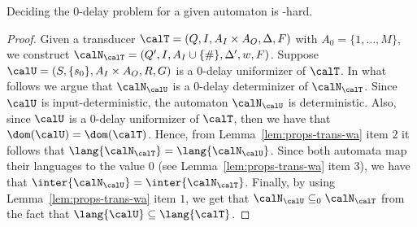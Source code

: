 \documentclass[a4paper]{article}
\begin{document}
\begin{lemma}\label{lem:0delay-exp-hard}
	Deciding the $0$-delay problem for a given automaton is
	\EXP-hard.
\end{lemma}
\begin{proof}
	Given a transducer $\calT = (Q,I,A_I \times A_O,\Delta,F)$ with $A_0 =
	\{1,\dots,M\}$, we construct
	$\calN_\calT = (Q',I,A_I\cup\{\#\},\Delta',w,F)$.
%
	Suppose $\calU = (S,\{s_0\},A_I \times A_O,R,G)$ is a $0$-delay
	uniformizer of $\calT$. 
	In what follows we argue that
	$\calN_\calU$ is %
	a $0$-delay determinizer of $\calN_{\calT}$. 
	Since $\calU$ is input-deterministic, the automaton $\calN_\calU$ is
	deterministic. Also, since $\calU$ is a $0$-delay uniformizer of
	$\calT$, then we have that $\dom(\calU) = \dom(\calT)$. Hence, from
	Lemma~\ref{lem:props-trans-wa} item $2$ it follows that $\lang{\calN_\calT}
	= \lang{\calN_\calU}$.
	Since both automata map their languages to the value $0$ (see
	Lemma~\ref{lem:props-trans-wa} item $3$), we have that
	$\inter{\calN_\calU} = \inter{\calN_\calT}$. Finally, by using
	Lemma~\ref{lem:props-trans-wa} item $1$, we get that $\calN_\calU
	\subseteq_0 \calN_\calT$ from the fact that $\lang{\calU} \subseteq
	\lang{\calT}$.


\end{proof}
\end{document}
